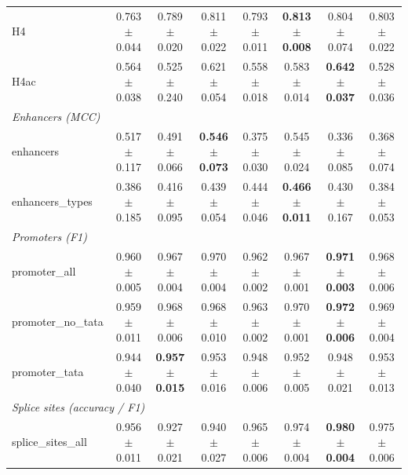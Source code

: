 \begin{tabular}{lccccccc}
H4 & 0.763{\scriptsize$\,\pm\,$0.044} & 0.789{\scriptsize$\,\pm\,$0.020} & 0.811{\scriptsize$\,\pm\,$0.022} & 0.793{\scriptsize$\,\pm\,$0.011} & \textbf{0.813{\scriptsize$\,\pm\,$0.008}} & 0.804{\scriptsize$\,\pm\,$0.074} & 0.803{\scriptsize$\,\pm\,$0.022} \\
H4ac & 0.564{\scriptsize$\,\pm\,$0.038} & 0.525{\scriptsize$\,\pm\,$0.240} & 0.621{\scriptsize$\,\pm\,$0.054} & 0.558{\scriptsize$\,\pm\,$0.018} & 0.583{\scriptsize$\,\pm\,$0.014} & \textbf{0.642{\scriptsize$\,\pm\,$0.037}} & 0.528{\scriptsize$\,\pm\,$0.036} \\
\multicolumn{8}{l}{\emph{Enhancers (MCC)}} \\
enhancers & 0.517{\scriptsize$\,\pm\,$0.117} & 0.491{\scriptsize$\,\pm\,$0.066} & \textbf{0.546{\scriptsize$\,\pm\,$0.073}} & 0.375{\scriptsize$\,\pm\,$0.030} & 0.545{\scriptsize$\,\pm\,$0.024} & 0.336{\scriptsize$\,\pm\,$0.085} & 0.368{\scriptsize$\,\pm\,$0.074} \\
enhancers\_types & 0.386{\scriptsize$\,\pm\,$0.185} & 0.416{\scriptsize$\,\pm\,$0.095} & 0.439{\scriptsize$\,\pm\,$0.054} & 0.444{\scriptsize$\,\pm\,$0.046} & \textbf{0.466{\scriptsize$\,\pm\,$0.011}} & 0.430{\scriptsize$\,\pm\,$0.167} & 0.384{\scriptsize$\,\pm\,$0.053} \\
\multicolumn{8}{l}{\emph{Promoters (F1)}} \\
promoter\_all & 0.960{\scriptsize$\,\pm\,$0.005} & 0.967{\scriptsize$\,\pm\,$0.004} & 0.970{\scriptsize$\,\pm\,$0.004} & 0.962{\scriptsize$\,\pm\,$0.002} & 0.967{\scriptsize$\,\pm\,$0.001} & \textbf{0.971{\scriptsize$\,\pm\,$0.003}} & 0.968{\scriptsize$\,\pm\,$0.006} \\
promoter\_no\_tata & 0.959{\scriptsize$\,\pm\,$0.011} & 0.968{\scriptsize$\,\pm\,$0.006} & 0.968{\scriptsize$\,\pm\,$0.010} & 0.963{\scriptsize$\,\pm\,$0.002} & 0.970{\scriptsize$\,\pm\,$0.001} & \textbf{0.972{\scriptsize$\,\pm\,$0.006}} & 0.969{\scriptsize$\,\pm\,$0.004} \\
promoter\_tata & 0.944{\scriptsize$\,\pm\,$0.040} & \textbf{0.957{\scriptsize$\,\pm\,$0.015}} & 0.953{\scriptsize$\,\pm\,$0.016} & 0.948{\scriptsize$\,\pm\,$0.006} & 0.952{\scriptsize$\,\pm\,$0.005} & 0.948{\scriptsize$\,\pm\,$0.021} & 0.953{\scriptsize$\,\pm\,$0.013} \\
\multicolumn{8}{l}{\emph{Splice sites (accuracy / F1)}} \\
splice\_sites\_all & 0.956{\scriptsize$\,\pm\,$0.011} & 0.927{\scriptsize$\,\pm\,$0.021} & 0.940{\scriptsize$\,\pm\,$0.027} & 0.965{\scriptsize$\,\pm\,$0.006} & 0.974{\scriptsize$\,\pm\,$0.004} & \textbf{0.980{\scriptsize$\,\pm\,$0.004}} & 0.975{\scriptsize$\,\pm\,$0.006} \\

\end{tabular}
